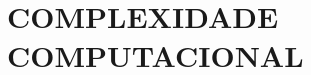 \chapter{COMPLEXIDADE COMPUTACIONAL}
\label{ch:computational_complexity}

\newcommand{\PhiDT}{{\mathcal{T}}} %
\newcommand{\PhiDS}{{\mathcal{S}}} %
\newcommand{\PhiNT}{{\mathcal{N\!T}}} %
\newcommand{\PhiNS}{{\mathcal{N\!\!S}}} %









